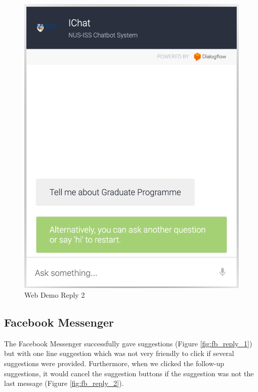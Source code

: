 		\begin{figure}[h]
			\centering
			\includegraphics[width=\linewidth/3]{img/webdemo_2.png}
			\caption{Web Demo Reply 2}
			\label{fig:web_demo_reply_2}
		\end{figure}

	\subsection{Facebook Messenger} %
	\label{sub:facebook_messenger}
		The Facebook Messenger successfully gave suggestions (Figure \ref{fig:fb_reply_1}) but with one line suggestion which was not very friendly to click if several suggestions were provided. Furthermore, when we clicked the follow-up suggestions, it would cancel the suggestion buttons if the suggestion was not the last message (Figure \ref{fig:fb_reply_2}).

